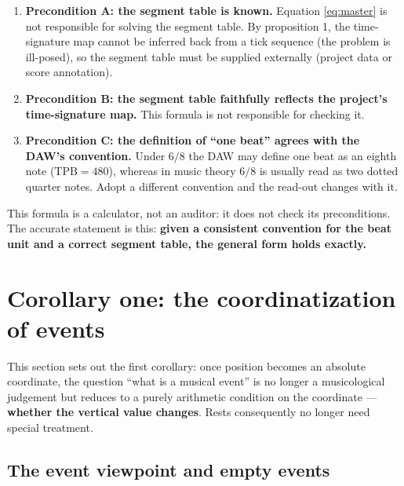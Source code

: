 \documentclass[11pt,a4paper]{article}
\begin{document}
\begin{enumerate}[leftmargin=2.2em,itemsep=0.15em,topsep=0.2em]
  \item \textbf{Precondition A: the segment table is known.} Equation \eqref{eq:master}
        is not responsible for solving the segment table. By proposition 1, the
        time-signature map cannot be inferred back from a tick sequence (the problem is
        ill-posed), so the segment table must be supplied externally (project data or
        score annotation).
  \item \textbf{Precondition B: the segment table faithfully reflects the project's
        time-signature map.} This formula is not responsible for checking it.
  \item \textbf{Precondition C: the definition of ``one beat'' agrees with the DAW's
        convention.} Under $6/8$ the DAW may define one beat as an eighth note
        ($\mathrm{TPB}=480$), whereas in music theory $6/8$ is usually read as two
        dotted quarter notes. Adopt a different convention and the read-out changes
        with it.
\end{enumerate}

\begin{remark}
This formula is a calculator, not an auditor: it does not check its preconditions. The
accurate statement is this: \textbf{given a consistent convention for the beat unit and
a correct segment table, the general form holds exactly.}
\end{remark}

\section{Corollary one: the coordinatization of events}
\label{sec:event}

This section sets out the first corollary: once position becomes an absolute
coordinate, the question ``what is a musical event'' is no longer a musicological
judgement but reduces to a purely arithmetic condition on the coordinate ---
\textbf{whether the vertical value changes}. Rests consequently no longer need special
treatment.
\subsection{The event viewpoint and empty events}
\end{document}
